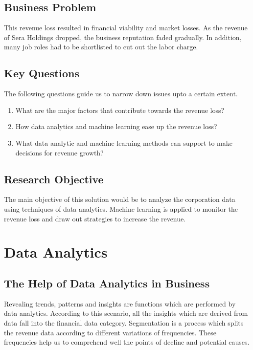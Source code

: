 \documentclass[12pt,a4Paper]{article}
\begin{document}
\subsection{Business Problem}
This revenue loss resulted in financial viability and market losses. As the revenue of Sera Holdings dropped, the business reputation faded gradually. In addition, many job roles had to be shortlisted to cut out the labor charge.
\subsection{Key Questions}
The following questions guide us to narrow down issues upto a certain extent.
\begin{enumerate}
\item What are the major factors that contribute towards the revenue loss?
\item How data analytics and machine learning ease up the revenue loss?
\item What data analytic and machine learning methods can support to make decisions for revenue growth? 
\end{enumerate}
\subsection{Research Objective}
The main objective of this solution would be to analyze the corporation data using techniques of data analytics. Machine learning is applied to monitor the revenue loss and draw out strategies to increase the revenue.
\section{Data Analytics}
\subsection{The Help of Data Analytics in Business}
Revealing trends, patterns and insights are functions which are performed by data analytics. According to this scenario, all the insights which are derived from data fall into the financial data category. Segmentation is a process which splits the revenue data according to different variations of frequencies. These frequencies help us to comprehend well the points of decline and potential causes. 
\end{document}
